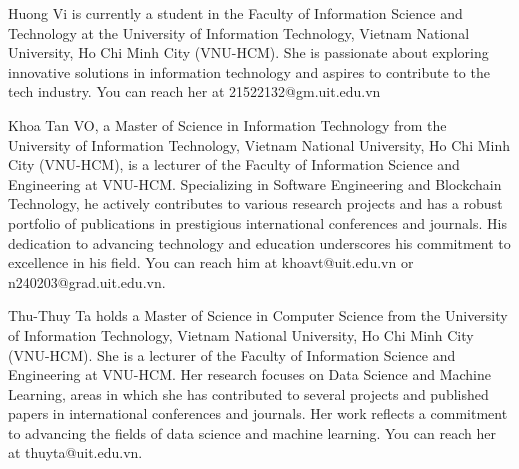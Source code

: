 \documentclass{ieeeaccess}
\begin{document}
\begin{IEEEbiography}
{Huong Vi} is currently a student in the Faculty of Information Science and Technology at the University of Information Technology, Vietnam National University, Ho Chi Minh City (VNU-HCM). She is passionate about exploring innovative solutions in information technology and aspires to contribute to the tech industry. You can reach her at 21522132@gm.uit.edu.vn
\end{IEEEbiography}

\begin{IEEEbiography}{Khoa Tan VO}, a Master of Science in Information Technology from the University of Information Technology, Vietnam National University, Ho Chi Minh City (VNU-HCM), is a lecturer of the Faculty of Information Science and Engineering at VNU-HCM. Specializing in Software Engineering and Blockchain Technology, he actively contributes to various research projects and has a robust portfolio of publications in prestigious international conferences and journals. His dedication to advancing technology and education underscores his commitment to excellence in his field. You can reach him at khoavt@uit.edu.vn or n240203@grad.uit.edu.vn.
\end{IEEEbiography}

\begin{IEEEbiography}{Thu-Thuy Ta} holds a Master of Science in Computer Science from the University of Information Technology, Vietnam National University, Ho Chi Minh City (VNU-HCM). She is a lecturer of the Faculty of Information Science and Engineering at VNU-HCM. Her research focuses on Data Science and Machine Learning, areas in which she has contributed to several projects and published papers in international conferences and journals. Her work reflects a commitment to advancing the fields of data science and machine learning. You can reach her at thuyta@uit.edu.vn.
\end{IEEEbiography}
\end{document}
